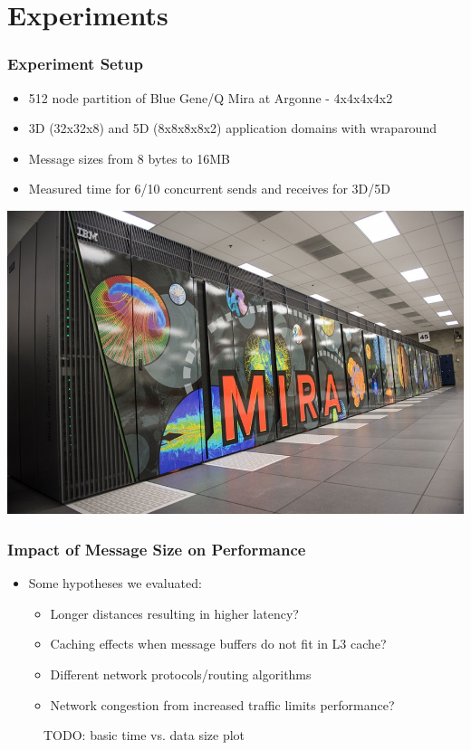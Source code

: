 \documentclass{beamer}
\begin{document}
\section{Experiments}
\begin{frame}
\frametitle{Experiment Setup}
\begin{itemize}
  \item 512 node partition of Blue Gene/Q Mira at Argonne - 4x4x4x4x2
  \item 3D (32x32x8) and 5D (8x8x8x8x2) application domains with wraparound
  \item Message sizes from 8 bytes to 16MB
  \item Measured time for 6/10 concurrent sends and receives for 3D/5D
\end{itemize}

\centering
\includegraphics[width=0.45\linewidth]{mira}

\end{frame}

\begin{frame}
\frametitle{Impact of Message Size on Performance}
\begin{itemize}
  \item Some hypotheses we evaluated:
  \begin{itemize}
    \item Longer distances resulting in higher latency?
    \item Caching effects when message buffers do not fit in L3 cache?
    \item Different network protocols/routing algorithms
    \item Network congestion from increased traffic limits performance?
  \end{itemize}
\end{itemize}

\begin{figure}
TODO: basic time vs. data size plot
\end{figure}
\end{frame}
\end{document}
